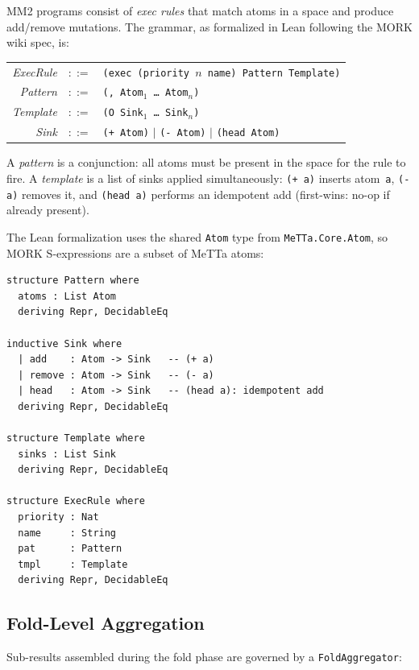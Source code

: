 \documentclass[11pt]{article}
\theoremstyle{definition}
\theoremstyle{remark}
\newcommand{\MORK}{\textup{MORK}}
\newcommand{\MeTTa}{\textup{MeTTa}}
\begin{document}
MM2 programs consist of \emph{exec rules} that match atoms in a space and
produce add/remove mutations.
The grammar, as formalized in Lean following the MORK wiki spec, is:
\begin{center}
\begin{tabular}{@{}rcl@{}}
\textit{ExecRule}  & $::=$ & \texttt{(exec (priority $n$ name) Pattern Template)} \\
\textit{Pattern}   & $::=$ & \texttt{(, Atom$_1$ \ldots{} Atom$_n$)} \\
\textit{Template}  & $::=$ & \texttt{(O Sink$_1$ \ldots{} Sink$_n$)} \\
\textit{Sink}      & $::=$ & \texttt{(+ Atom)} $\mid$ \texttt{(- Atom)} $\mid$ \texttt{(head Atom)} \\
\end{tabular}
\end{center}

\noindent
A \emph{pattern} is a conjunction: all atoms must be present in the space
for the rule to fire.
A \emph{template} is a list of sinks applied simultaneously: \texttt{(+ a)}
inserts atom~\texttt{a}, \texttt{(- a)} removes it, and \texttt{(head a)}
performs an idempotent add (first-wins: no-op if already present).

The Lean formalization uses the shared \texttt{Atom} type from
\texttt{MeTTa.Core.Atom}, so \MORK{} S-expressions are a subset of \MeTTa{}
atoms:

\begin{lstlisting}[caption={MM2 syntax types (\texttt{Syntax.lean}).}]
structure Pattern where
  atoms : List Atom
  deriving Repr, DecidableEq

inductive Sink where
  | add    : Atom -> Sink   -- (+ a)
  | remove : Atom -> Sink   -- (- a)
  | head   : Atom -> Sink   -- (head a): idempotent add
  deriving Repr, DecidableEq

structure Template where
  sinks : List Sink
  deriving Repr, DecidableEq

structure ExecRule where
  priority : Nat
  name     : String
  pat      : Pattern
  tmpl     : Template
  deriving Repr, DecidableEq
\end{lstlisting}

\subsection{Fold-Level Aggregation}

Sub-results assembled during the fold phase are governed by a
\texttt{FoldAggregator}:
\end{document}
